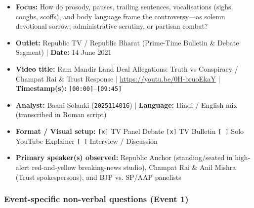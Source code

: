 \documentclass[10pt,a4paper]{article}
\begin{document}
\begin{itemize}
  \item \textbf{Focus:} How do prosody, pauses, trailing sentences, vocalisations (sighs, coughs, scoffs), and body language frame the controversy---as solemn devotional sorrow, administrative scrutiny, or partisan combat?
  \item \textbf{Outlet:} Republic TV / Republic Bharat (Prime-Time Bulletin \& Debate Segment) | \textbf{Date:} 14 June 2021
  \item \textbf{Video title:} Ram Mandir Land Deal Allegations: Truth vs Conspiracy / Champat Rai \& Trust Response | \href{https://youtu.be/0H-bruoEkaY}{https://youtu.be/0H-bruoEkaY} | \textbf{Timestamp(s):} \texttt{[00:00]}--\texttt{[09:45]}
  \item \textbf{Analyst:} Baani Solanki (\texttt{2025114016}) | \textbf{Language:} Hindi / English mix (transcribed in Roman script)
  \item \textbf{Format / Visual setup:} \texttt{[x]} TV Panel Debate \texttt{[x]} TV Bulletin \texttt{[ ]} Solo YouTube Explainer \texttt{[ ]} Interview / Discussion
  \item \textbf{Primary speaker(s) observed:} Republic Anchor (standing/seated in high-alert red-and-yellow breaking-news studio), Champat Rai \& Anil Mishra (Trust spokespersons), and BJP vs. SP/AAP panelists
\end{itemize}

\subsubsection*{Event-specific non-verbal questions (Event 1)}
\end{document}
